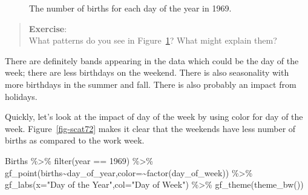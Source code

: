 \documentclass[
  letterpaper,
  DIV=11,
  numbers=noendperiod]{scrreprt}
\newenvironment{Shaded}{\begin{snugshade}}{\end{snugshade}}
\newcommand{\AttributeTok}[1]{\textcolor[rgb]{0.40,0.45,0.13}{#1}}
\newcommand{\DecValTok}[1]{\textcolor[rgb]{0.68,0.00,0.00}{#1}}
\newcommand{\FunctionTok}[1]{\textcolor[rgb]{0.28,0.35,0.67}{#1}}
\newcommand{\NormalTok}[1]{\textcolor[rgb]{0.00,0.23,0.31}{#1}}
\newcommand{\SpecialCharTok}[1]{\textcolor[rgb]{0.37,0.37,0.37}{#1}}
\newcommand{\StringTok}[1]{\textcolor[rgb]{0.13,0.47,0.30}{#1}}
\begin{document}
\begin{figure}[H]


\caption{\label{fig-scat71}The number of births for each day of the year
in 1969.}

\end{figure}%

\begin{quote}
\textbf{Exercise}:\\
What patterns do you see in Figure~\ref{fig-scat71}? What might explain
them?
\end{quote}

There are definitely bands appearing in the data which could be the day
of the week; there are less birthdays on the weekend. There is also
seasonality with more birthdays in the summer and fall. There is also
probably an impact from holidays.

Quickly, let's look at the impact of day of the week by using color for
day of the week. Figure~\ref{fig-scat72} makes it clear that the
weekends have less number of births as compared to the work week.

\begin{Shaded}
\begin{Highlighting}[]
\NormalTok{Births }\SpecialCharTok{\%\textgreater{}\%}
  \FunctionTok{filter}\NormalTok{(year }\SpecialCharTok{==} \DecValTok{1969}\NormalTok{) }\SpecialCharTok{\%\textgreater{}\%}
  \FunctionTok{gf\_point}\NormalTok{(births}\SpecialCharTok{\textasciitilde{}}\NormalTok{day\_of\_year,}\AttributeTok{color=}\SpecialCharTok{\textasciitilde{}}\FunctionTok{factor}\NormalTok{(day\_of\_week)) }\SpecialCharTok{\%\textgreater{}\%}
  \FunctionTok{gf\_labs}\NormalTok{(}\AttributeTok{x=}\StringTok{"Day of the Year"}\NormalTok{,}\AttributeTok{col=}\StringTok{"Day of Week"}\NormalTok{) }\SpecialCharTok{\%\textgreater{}\%}
  \FunctionTok{gf\_theme}\NormalTok{(}\FunctionTok{theme\_bw}\NormalTok{())}
\end{Highlighting}
\end{Shaded}
\end{document}
